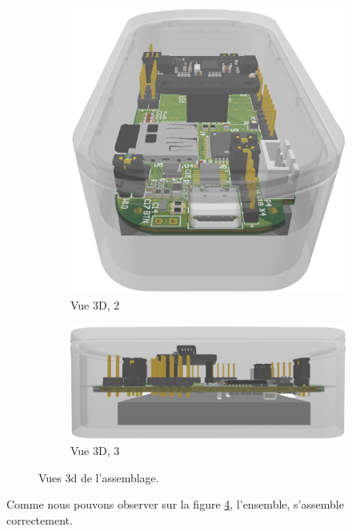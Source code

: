 \begin{figure}[!h]
\begin{subfigure}[b]{0.24\textwidth}
		\label{fig:3d-1}
	\end{subfigure}
	\hfill
	\begin{subfigure}[b]{0.33\textwidth}
		\centering
		\includegraphics[width=\textwidth]{../figures/dev-pcb/3d-view2}
		\caption{Vue 3D, 2}
		\label{fig:3d-2}
	\end{subfigure}
	\hfill
	\begin{subfigure}[b]{0.36\textwidth}
		\centering
		\includegraphics[width=\textwidth]{../figures/dev-pcb/3d-view1}
		\caption{Vue 3D, 3}
		\label{fig:3d-3}
	\end{subfigure}
	\caption{Vues 3d de l'assemblage.}
	\label{fig:MechAssembly}
\end{figure}

Comme nous pouvons observer sur la figure \ref{fig:MechAssembly}, l'ensemble, s'assemble correctement.

